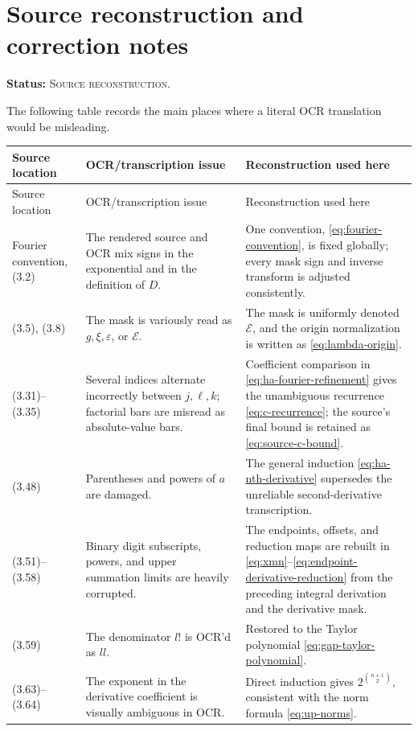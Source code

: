 \documentclass[11pt,oneside]{article}
\theoremstyle{definition}
\theoremstyle{remark}
\newcommand{\SourceStatus}{\textcolor{SourceBlue}{\textsc{Source reconstruction}}}
\newcommand{\status}[1]{\par\smallskip\noindent\textbf{Status:} #1.\par\smallskip}
\begin{document}
\appendix

\section{Source reconstruction and correction notes}
\label{app:repairs}

\status{\SourceStatus}

The following table records the main places where a literal OCR translation would be misleading.

\begin{longtable}{>{\raggedright\arraybackslash}p{} >{\raggedright\arraybackslash}p{} >{\raggedright\arraybackslash}p{}}
\toprule
Source location & OCR/transcription issue & Reconstruction used here\\
\midrule
\endfirsthead
\toprule
Source location & OCR/transcription issue & Reconstruction used here\\
\midrule
\endhead
Fourier convention, (3.2) & The rendered source and OCR mix signs in the exponential and in the definition of \(D\). & One convention, \eqref{eq:fourier-convention}, is fixed globally; every mask sign and inverse transform is adjusted consistently.\\
(3.5), (3.8) & The mask is variously read as \(g,\xi,\varepsilon\), or \(\mathcal E\). & The mask is uniformly denoted \(\mathcal E\), and the origin normalization is written as \eqref{eq:lambda-origin}.\\
(3.31)--(3.35) & Several indices alternate incorrectly between \(j,\ell,k\); factorial bars are misread as absolute-value bars. & Coefficient comparison in \eqref{eq:ha-fourier-refinement} gives the unambiguous recurrence \eqref{eq:c-recurrence}; the source's final bound is retained as \eqref{eq:source-c-bound}.\\
(3.48) & Parentheses and powers of \(a\) are damaged. & The general induction \eqref{eq:ha-nth-derivative} supersedes the unreliable second-derivative transcription.\\
(3.51)--(3.58) & Binary digit subscripts, powers, and upper summation limits are heavily corrupted. & The endpoints, offsets, and reduction maps are rebuilt in \eqref{eq:xmn}--\eqref{eq:endpoint-derivative-reduction} from the preceding integral derivation and the derivative mask.\\
(3.59) & The denominator \(l!\) is OCR'd as \(ll\). & Restored to the Taylor polynomial \eqref{eq:gap-taylor-polynomial}.\\
(3.63)--(3.64) & The exponent in the derivative coefficient is visually ambiguous in OCR. & Direct induction gives \(2^{\binom{n+1}{2}}\), consistent with the norm formula \eqref{eq:up-norms}.\\

\end{longtable}
\end{document}
